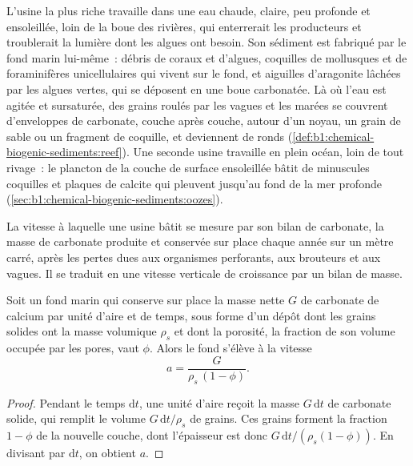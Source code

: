 L'usine la plus riche travaille dans une eau chaude, claire, peu profonde et ensoleillée, loin
de la boue des rivières, qui enterrerait les producteurs et troublerait la lumière dont les
algues ont besoin. Son sédiment est fabriqué par le fond marin lui-même~: débris de coraux
et d'algues, coquilles de mollusques et de foraminifères unicellulaires qui vivent
sur le fond, et aiguilles d'aragonite lâchées par les algues vertes, qui se déposent en une
boue carbonatée. Là où l'eau est agitée et sursaturée, des grains roulés par
les vagues et les marées se couvrent d'enveloppes de carbonate, couche après couche, autour d'un noyau,
un grain de sable ou un fragment de coquille, et deviennent de ronds 
(\cref{def:b1:chemical-biogenic-sediments:reef}). Une seconde usine travaille en
plein océan, loin de tout rivage~: le plancton de la couche de surface ensoleillée
bâtit de minuscules coquilles et plaques de calcite qui pleuvent jusqu'au fond de la mer profonde
(\cref{sec:b1:chemical-biogenic-sediments:oozes}).

La vitesse à laquelle une usine bâtit se mesure par son bilan de carbonate, la masse de
carbonate produite et conservée sur place chaque année sur un mètre carré, après
les pertes dues aux organismes perforants, aux brouteurs et aux vagues. Il se traduit en une
vitesse verticale de croissance par un bilan de masse.

\begin{proposition}\label{prop:b1:chemical-biogenic-sediments:accretion}
Soit un fond marin qui conserve sur place la masse nette $G$ de carbonate de calcium par unité d'aire
et de temps, sous forme d'un dépôt dont les grains solides ont la masse volumique $\rho_s$
et dont la porosité, la fraction de son volume occupée par les pores, vaut $\phi$. Alors
le fond s'élève à la vitesse
\[
a = \frac{G}{\rho_s\,(1-\phi)}.
\]
\end{proposition}

\begin{proof}
Pendant le temps $\mathrm dt$, une unité d'aire reçoit la masse $G\,\mathrm dt$ de
carbonate solide, qui remplit le volume $G\,\mathrm dt/\rho_s$ de grains. Ces
grains forment la fraction $1-\phi$ de la nouvelle couche, dont l'épaisseur est
donc $G\,\mathrm dt/(\rho_s(1-\phi))$. En divisant par $\mathrm dt$, on obtient $a$.
\end{proof}

